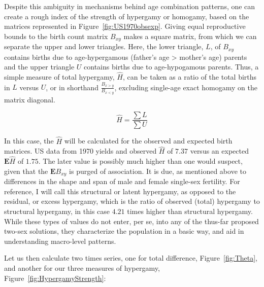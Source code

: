 Despite this ambiguity in mechanisms behind age combination patterns, one can
create a rough index of the strength of hypergamy or homogamy, based on the
matrices represented in Figure~\ref{fig:US1970obsexp}. Giving equal reproductive
bounds to the birth count matrix $B_{xy}$ makes a square matrix, from which we
can separate the upper and lower triangles. Here, the lower triangle, $L$,
of $B_{xy}$ contains births due to age-hypergamous (father's age > mother's age)
parents and the upper triangle $U$ contains births due to age-hypogamous parents. Thus, a simple
measure of total hypergamy, $\widehat{H}$, can be taken as a ratio of the total
births in $L$ versus $U$, or in shorthand $\frac{B_{x>y}}{B_{x<y}}$, excluding
single-age exact homogamy on the matrix diagonal.

\begin{equation}
\widehat{H} = \frac{\sum L}{\sum U} 
\end{equation}

In this case, the $\widehat{H}$ will be calculated for the observed and expected
birth matrices. US data from 1970 yields and observed $\widehat{H}$ of $7.37$
versus an expected $\textbf{E}\widehat{H}$ of $1.75$. The later value is
possibly much higher than one would suspect, given that the $\textbf{E}B_{xy}$
is purged of association. It is due, as mentioned above to differences in the
shape and span of male and female single-sex fertility. For reference, I
will call this structural or latent hypergamy, as opposed to the residual, or
excess hypergamy, which is the ratio of observed (total) hypergamy to
structural hypergamy, in this case $4.21$ times higher
than structural hypergamy. While these types of values do not enter, per se, 
into any of the thus-far proposed two-sex solutions, they characterize the 
population in a basic way, and aid in understanding macro-level patterns. 

Let us then calculate two times series, one for total difference,
Figure~\ref{fig:Theta}, and another for our three measures of hypergamy,
Figure~\ref{fig:HypergamyStrength}:

